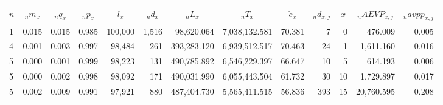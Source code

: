 \documentclass[fontsize=11pt]{article}
\begin{document}
\begin{landscape}
\begin{table}[]
\centering
\begin{tabular}{lrrrrrrrrrr|r|r|}
\hline
\multicolumn{1}{|l|}{$n$} & \multicolumn{1}{c|}{${}_nm_x$}   & \multicolumn{1}{c|}{${}_nq_x$}   & \multicolumn{1}{c|}{${}_{n}p_x$}   & \multicolumn{1}{c|}{$l_x$}      & \multicolumn{1}{c|}{${}_nd_x$}    & \multicolumn{1}{c|}{${}_nL_x$}         & \multicolumn{1}{c|}{${}_nT_x$}           & \multicolumn{1}{c|}{$\mathring{e}_x$}     & \multicolumn{1}{c|}{${}_nd_{x,j}$} & \multicolumn{1}{c|}{$x$} & \multicolumn{1}{c|}{${}_nAEVP_{x,j}$}             & \multicolumn{1}{c|}{${}_navpp_{x,j}$}       \\ \hline
\multicolumn{1}{|l|}{1} & \multicolumn{1}{r|}{0.015} & \multicolumn{1}{r|}{0.015} & \multicolumn{1}{r|}{0.985} & \multicolumn{1}{r|}{100,000} & \multicolumn{1}{r|}{1,516}  & \multicolumn{1}{r|}{98,620.064}  & \multicolumn{1}{r|}{7,038,132.581} & \multicolumn{1}{r|}{70.381} & \multicolumn{1}{r|}{7}     & 0                      & 476.009                                   & 0.005                               \\ \hline
\multicolumn{1}{|l|}{4} & \multicolumn{1}{r|}{0.001} & \multicolumn{1}{r|}{0.003} & \multicolumn{1}{r|}{0.997} & \multicolumn{1}{r|}{98,484}  & \multicolumn{1}{r|}{261}    & \multicolumn{1}{r|}{393,283.120} & \multicolumn{1}{r|}{6,939,512.517} & \multicolumn{1}{r|}{70.463} & \multicolumn{1}{r|}{24}    & 1                      & 1,611.160                                 & 0.016                               \\ \hline
\multicolumn{1}{|l|}{5} & \multicolumn{1}{r|}{0.000} & \multicolumn{1}{r|}{0.001} & \multicolumn{1}{r|}{0.999} & \multicolumn{1}{r|}{98,223}  & \multicolumn{1}{r|}{131}    & \multicolumn{1}{r|}{490,785.892} & \multicolumn{1}{r|}{6,546,229.397} & \multicolumn{1}{r|}{66.647} & \multicolumn{1}{r|}{10}    & 5                      & 614.193                                   & 0.006                               \\ \hline
\multicolumn{1}{|l|}{5} & \multicolumn{1}{r|}{0.000} & \multicolumn{1}{r|}{0.002} & \multicolumn{1}{r|}{0.998} & \multicolumn{1}{r|}{98,092}  & \multicolumn{1}{r|}{171}    & \multicolumn{1}{r|}{490,031.990} & \multicolumn{1}{r|}{6,055,443.504} & \multicolumn{1}{r|}{61.732} & \multicolumn{1}{r|}{30}    & 10                     & 1,729.897                                 & 0.017                               \\ \hline
\multicolumn{1}{|l|}{5} & \multicolumn{1}{r|}{0.002} & \multicolumn{1}{r|}{0.009} & \multicolumn{1}{r|}{0.991} & \multicolumn{1}{r|}{97,921}  & \multicolumn{1}{r|}{880}    & \multicolumn{1}{r|}{487,404.730} & \multicolumn{1}{r|}{5,565,411.515} & \multicolumn{1}{r|}{56.836} & \multicolumn{1}{r|}{393}   & 15                     & 20,760.595                                & 0.208                               \\ \hline

\end{tabular}
\end{table}
\end{landscape}
\end{document}
